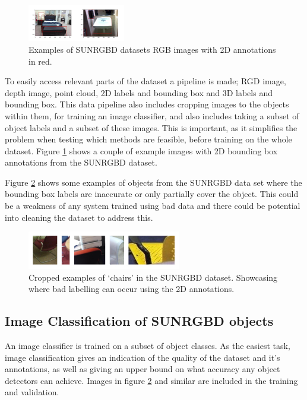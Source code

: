 \documentclass[11pt]{article}
\begin{document}
\begin{figure}
  \begin{center}
    \includegraphics[width=0.38\textwidth]{images/SUN_examples.jpg}
  \end{center}
  \caption{Examples of SUNRGBD datasets RGB images with 2D annotations in red.}
  \label{fig:SUN_examples}
\end{figure}

To easily access relevant parts of the dataset a pipeline is made; RGD image, depth image, point cloud, 2D labels and bounding box and 3D labels and bounding box. This data pipeline also includes cropping images to the objects within them, for training an image classifier, and also includes taking a subset of object labels and a subset of these images. This is important, as it simplifies the problem when testing which methods are feasible, before training on the whole dataset. Figure \ref{fig:SUN_examples} shows a couple of example images with 2D bounding box annotations from the SUNRGBD dataset.

Figure \ref{fig:bad_crops} shows some examples of objects from the SUNRGBD data set where the bounding box labels are inaccurate or only partially cover the object. This could be a weakness of any system trained using bad data and there could be potential into cleaning the dataset to address this.

\begin{figure}[H]
  \begin{center}
    \includegraphics[width=0.6\textwidth]{images/bad_crops.jpg}
  \end{center}
  \caption{Cropped examples of `chairs' in the SUNRGBD dataset. Showcasing where bad labelling can occur using the 2D annotations.}
  \label{fig:bad_crops}
\end{figure}

\subsection*{Image Classification of SUNRGBD objects}
An image classifier is trained on a subset of object classes. As the easiest task, image classification gives an indication of the quality of the dataset and it's annotations, as well as giving an upper bound on what accuracy any object detectors can achieve. Images in figure \ref{fig:bad_crops} and similar are included in the training and validation.
\end{document}
